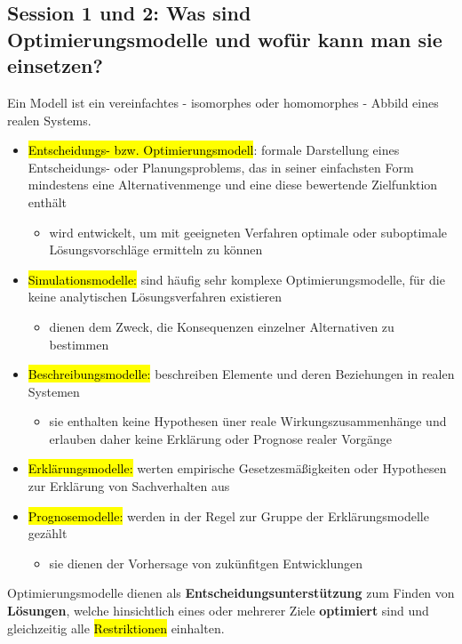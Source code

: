 \documentclass[a4paper, 10pt]{article}
\begin{document}
\subsection{Session 1 und 2: Was sind Optimierungsmodelle und wofür kann man sie einsetzen?}
Ein Modell ist ein vereinfachtes - isomorphes oder homomorphes - Abbild eines realen Systems.
\begin{itemize}
    \item \hl{Entscheidungs- bzw. Optimierungsmodell}: formale Darstellung eines Entscheidungs- oder Planungsproblems, das in seiner einfachsten Form mindestens eine Alternativenmenge und eine diese bewertende Zielfunktion enthält
    \begin{itemize}
        \item wird entwickelt, um mit geeigneten Verfahren optimale oder suboptimale Lösungsvorschläge ermitteln zu können
    \end{itemize}

    \item \hl{Simulationsmodelle:} sind häufig sehr komplexe Optimierungsmodelle, für die keine analytischen Lösungsverfahren existieren
    \begin{itemize}
        \item dienen dem Zweck, die Konsequenzen einzelner Alternativen zu bestimmen
    \end{itemize}

    \item \hl{Beschreibungsmodelle:} beschreiben Elemente und deren Beziehungen in realen Systemen
    \begin{itemize}
        \item sie enthalten keine Hypothesen üner reale Wirkungszusammenhänge und erlauben daher keine Erklärung oder Prognose realer Vorgänge
    \end{itemize}
    \item \hl{Erklärungsmodelle:} werten empirische Gesetzesmäßigkeiten oder Hypothesen zur Erklärung von Sachverhalten aus
  
        \item \hl{Prognosemodelle:} werden in der Regel zur Gruppe der Erklärungsmodelle gezählt
        \begin{itemize}
            \item sie dienen der Vorhersage von zukünfitgen Entwicklungen
        \end{itemize}
  
    \end{itemize}
\begin{definitionbox}
    Optimierungsmodelle dienen als \textbf{Entscheidungsunterstützung} zum Finden von \textbf{Lösungen}, welche hinsichtlich eines oder mehrerer Ziele \textbf{optimiert} sind und gleichzeitig alle \hl{Restriktionen} einhalten.
\end{definitionbox}
\end{document}
